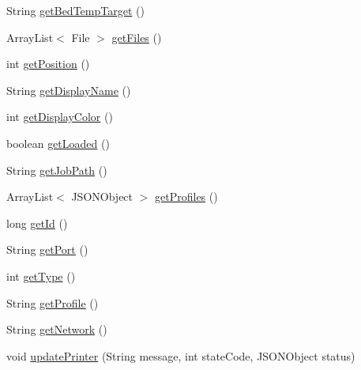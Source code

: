 \begin{DoxyCompactItemize}
\item 
String \hyperlink{classandroid_1_1app_1_1printerapp_1_1model_1_1_model_printer_ac7351b2e60be1a79efcfb64094768d5f}{get\+Bed\+Temp\+Target} ()
\item 
Array\+List$<$ File $>$ \hyperlink{classandroid_1_1app_1_1printerapp_1_1model_1_1_model_printer_ad0efac583ee579c337cd1036705b9d6c}{get\+Files} ()
\item 
int \hyperlink{classandroid_1_1app_1_1printerapp_1_1model_1_1_model_printer_a269815fb6149db56d4fa6922d0490bd9}{get\+Position} ()
\item 
String \hyperlink{classandroid_1_1app_1_1printerapp_1_1model_1_1_model_printer_ac436ea9a3d6dba02f28f31d13f7c1c74}{get\+Display\+Name} ()
\item 
int \hyperlink{classandroid_1_1app_1_1printerapp_1_1model_1_1_model_printer_a3722ac33455f1c8372a198c74e846c2b}{get\+Display\+Color} ()
\item 
boolean \hyperlink{classandroid_1_1app_1_1printerapp_1_1model_1_1_model_printer_a598c03a6a6a01382431a172bf9649a4f}{get\+Loaded} ()
\item 
String \hyperlink{classandroid_1_1app_1_1printerapp_1_1model_1_1_model_printer_a6a3b9499374ac43943f6c5746ec22b28}{get\+Job\+Path} ()
\item 
Array\+List$<$ J\+S\+O\+N\+Object $>$ \hyperlink{classandroid_1_1app_1_1printerapp_1_1model_1_1_model_printer_a0e9663d57fba02c3017d7eb8e0cd2472}{get\+Profiles} ()
\item 
long \hyperlink{classandroid_1_1app_1_1printerapp_1_1model_1_1_model_printer_abe17bacd6356e2cd36788e800d78e2dd}{get\+Id} ()
\item 
String \hyperlink{classandroid_1_1app_1_1printerapp_1_1model_1_1_model_printer_a9af5405080af2169ca67ae8f047bac74}{get\+Port} ()
\item 
int \hyperlink{classandroid_1_1app_1_1printerapp_1_1model_1_1_model_printer_a164d2aa6b20addda248d8b7116a56ad5}{get\+Type} ()
\item 
String \hyperlink{classandroid_1_1app_1_1printerapp_1_1model_1_1_model_printer_ad88c0b34b0403829095f2b4056eef3f8}{get\+Profile} ()
\item 
String \hyperlink{classandroid_1_1app_1_1printerapp_1_1model_1_1_model_printer_a85155728224089940265c36946dd0924}{get\+Network} ()
\item 
void \hyperlink{classandroid_1_1app_1_1printerapp_1_1model_1_1_model_printer_aaed4c0825cb85640c3e198078320c2ef}{update\+Printer} (String message, int state\+Code, J\+S\+O\+N\+Object status)

\end{DoxyCompactItemize}
